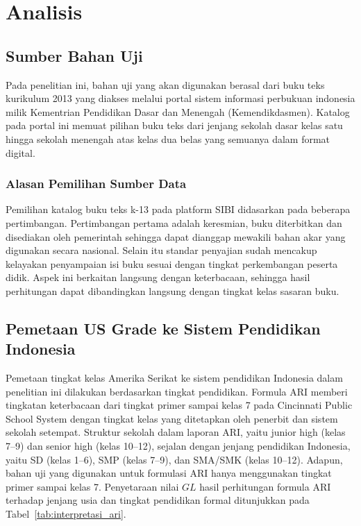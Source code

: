  \chapter{Analisis}
\label{chap:analisis}

\section{Sumber Bahan Uji}
\label{sec:3:sistemkini}

Pada penelitian ini, bahan uji yang akan digunakan berasal dari buku teks kurikulum 2013 yang diakses melalui portal sistem informasi perbukuan indonesia milik Kementrian Pendidikan Dasar dan Menengah (Kemendikdasmen). Katalog pada portal ini memuat pilihan buku teks dari jenjang sekolah dasar kelas satu hingga sekolah menengah atas kelas dua belas yang semuanya dalam format digital. 

\subsection{Alasan Pemilihan Sumber Data}
Pemilihan katalog buku teks k-13 pada platform SIBI didasarkan pada beberapa pertimbangan. Pertimbangan pertama adalah keresmian, buku diterbitkan dan disediakan oleh pemerintah sehingga dapat dianggap mewakili bahan akar yang digunakan secara nasional. Selain itu standar penyajian sudah mencakup kelayakan penyampaian isi buku sesuai dengan tingkat perkembangan peserta didik. Aspek ini berkaitan langsung dengan keterbacaan, sehingga hasil perhitungan dapat dibandingkan langsung dengan tingkat kelas sasaran buku. 

\section{Pemetaan US Grade ke Sistem Pendidikan Indonesia}
Pemetaan tingkat kelas Amerika Serikat ke sistem pendidikan Indonesia dalam penelitian ini dilakukan berdasarkan tingkat pendidikan. Formula ARI memberi tingkatan keterbacaan dari tingkat primer sampai kelas 7 pada Cincinnati Public School System dengan tingkat kelas yang ditetapkan oleh penerbit dan sistem sekolah setempat. Struktur sekolah dalam laporan ARI, yaitu junior high (kelas 7–9) dan senior high (kelas 10–12), sejalan dengan jenjang pendidikan Indonesia, yaitu SD (kelas 1–6), SMP (kelas 7–9), dan SMA/SMK (kelas 10–12). Adapun, bahan uji yang digunakan untuk formulasi ARI hanya menggunakan tingkat primer sampai kelas 7. Penyetaraan nilai $GL$ hasil perhitungan formula ARI terhadap jenjang usia dan tingkat pendidikan formal ditunjukkan pada Tabel~\ref{tab:interpretasi_ari}.

